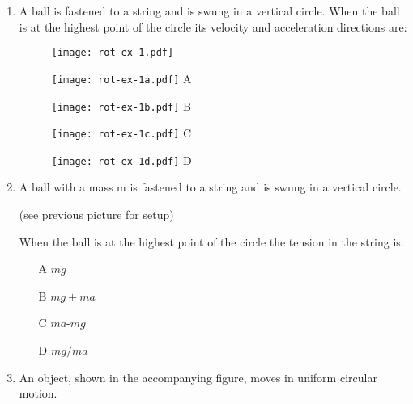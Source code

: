 \begin{enumerate}


\item 

A ball is fastened to a string and is swung in a vertical circle. When the ball is at the
highest point of the circle its velocity and acceleration directions are:

\begin{figure}[H]
\centering
\texttt{[image: rot-ex-1.pdf]}
\end{figure}

\begin{figure}[h]

\centering

\begin{minipage}{.1\textwidth}
  \centering
  \texttt{[image: rot-ex-1a.pdf]}
  A
\end{minipage}
\hspace{1cm}
\begin{minipage}{.1\textwidth}
  \centering
  \texttt{[image: rot-ex-1b.pdf]}
  B
\end{minipage}
\hspace{1cm}
\begin{minipage}{.1\textwidth}
  \centering
  \texttt{[image: rot-ex-1c.pdf]}
  C
\end{minipage}
\hspace{1cm}
\begin{minipage}{.1\textwidth}
  \centering
  \texttt{[image: rot-ex-1d.pdf]}
  D
\end{minipage}
\end{figure}

\item A ball with a mass m is fastened to a string and is swung in a vertical circle. 

(see previous picture for setup)

When the ball is at the highest point of the circle the tension in the string is:

\begin{itemize}
\item[A] $mg$
\item[B] $mg + ma$
\item[C] $ma ‐mg$ 
\item[D] $mg/ma$
\end{itemize}

\item An object, shown in the accompanying figure, moves in uniform circular motion.


\end{enumerate}
